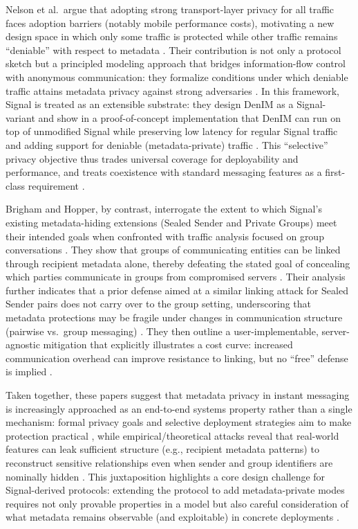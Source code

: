 Nelson et al.\ argue that adopting strong transport-layer privacy for all traffic faces adoption barriers (notably mobile performance costs), motivating a new design space in which only some traffic is protected while other traffic remains “deniable” with respect to metadata \cite{nelson2024}. Their contribution is not only a protocol sketch but a principled modeling approach that bridges information-flow control with anonymous communication: they formalize conditions under which deniable traffic attains metadata privacy against strong adversaries \cite{nelson2024}. In this framework, Signal is treated as an extensible substrate: they design DenIM as a Signal-variant and show in a proof-of-concept implementation that DenIM can run on top of unmodified Signal while preserving low latency for regular Signal traffic and adding support for deniable (metadata-private) traffic \cite{nelson2024}. This “selective” privacy objective thus trades universal coverage for deployability and performance, and treats coexistence with standard messaging features as a first-class requirement \cite{nelson2024}.

Brigham and Hopper, by contrast, interrogate the extent to which Signal’s existing metadata-hiding extensions (Sealed Sender and Private Groups) meet their intended goals when confronted with traffic analysis focused on group conversations \cite{brigham2025}. They show that groups of communicating entities can be linked through recipient metadata alone, thereby defeating the stated goal of concealing which parties communicate in groups from compromised servers \cite{brigham2025}. Their analysis further indicates that a prior defense aimed at a similar linking attack for Sealed Sender pairs does not carry over to the group setting, underscoring that metadata protections may be fragile under changes in communication structure (pairwise vs.\ group messaging) \cite{brigham2025}. They then outline a user-implementable, server-agnostic mitigation that explicitly illustrates a cost curve: increased communication overhead can improve resistance to linking, but no “free” defense is implied \cite{brigham2025}.

Taken together, these papers suggest that metadata privacy in instant messaging is increasingly approached as an end-to-end systems property rather than a single mechanism: formal privacy goals and selective deployment strategies aim to make protection practical \cite{nelson2024}, while empirical/theoretical attacks reveal that real-world features can leak sufficient structure (e.g., recipient metadata patterns) to reconstruct sensitive relationships even when sender and group identifiers are nominally hidden \cite{brigham2025}. This juxtaposition highlights a core design challenge for Signal-derived protocols: extending the protocol to add metadata-private modes requires not only provable properties in a model but also careful consideration of what metadata remains observable (and exploitable) in concrete deployments \cite{nelson2024,brigham2025}.

